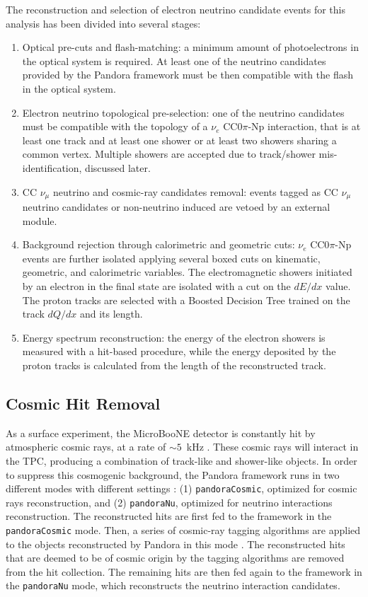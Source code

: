 The reconstruction and selection of electron neutrino candidate events for this analysis has been divided into several stages:
\begin{enumerate}
\item Optical pre-cuts and flash-matching: a minimum amount of photoelectrons in the optical system is required. At least one of the neutrino candidates provided by the Pandora framework must be then compatible with the flash in the optical system.
\item Electron neutrino topological pre-selection: one of the neutrino candidates must be compatible with the topology of a $\nu_{e}$ CC0$\pi$-Np interaction, that is at least one track and at least one shower or at least two showers sharing a common vertex.  Multiple showers are accepted due to track/shower mis-identification, discussed later.
\item CC $\nu_{\mu}$ neutrino and cosmic-ray candidates removal: events tagged as CC $\nu_{\mu}$ neutrino candidates or non-neutrino induced are vetoed by an external module.
\item Background rejection through calorimetric and geometric cuts: $\nu_{e}$ CC0$\pi$-Np events are further isolated applying several boxed cuts on kinematic, geometric, and calorimetric variables. The electromagnetic showers initiated by an electron in the final state are isolated with a cut on the $dE/dx$ value. The proton tracks are selected with a Boosted Decision Tree trained on the track $dQ/dx$ and its length.
\item Energy spectrum reconstruction: the energy of the electron showers is measured with a hit-based procedure, while the energy deposited by the proton tracks is calculated from the length of the reconstructed track. 
\end{enumerate}

\subsection{Cosmic Hit Removal}
As a surface experiment, the MicroBooNE detector is constantly hit by atmospheric cosmic rays, at a rate of $\sim 5$~kHz \cite{cosmic}. These cosmic rays will interact in the TPC, producing a combination of track-like and shower-like objects. 
In order to suppress this cosmogenic background, the Pandora framework runs in two different modes with different settings \cite{pandora}: (1) \texttt{pandoraCosmic}, optimized for cosmic rays reconstruction, and (2) \texttt{pandoraNu}, optimized for neutrino interactions reconstruction.
The reconstructed hits are first fed to the framework in the \texttt{pandoraCosmic} mode. Then, a series of cosmic-ray tagging algorithms are applied to the objects reconstructed by Pandora in this mode \cite{ubxsec}. The reconstructed hits that are deemed to be of cosmic origin by the tagging algorithms are removed from the hit collection. The remaining hits are then fed again to the framework in the \texttt{pandoraNu} mode, which reconstructs the neutrino interaction candidates.

